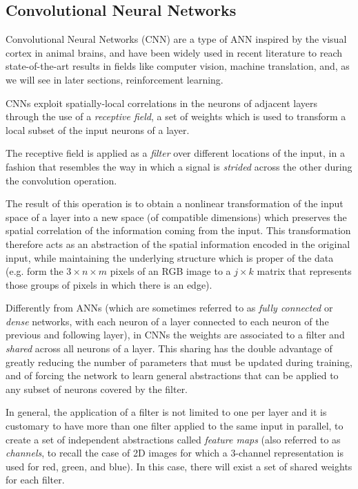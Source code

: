 \subsection{Convolutional Neural Networks} \label{s:CNN}
Convolutional Neural Networks (CNN) are a type of ANN inspired by the visual 
cortex in animal brains, and have been widely used in recent literature to 
reach state-of-the-art results in fields like computer vision, machine 
translation, and, as we will see in later sections, reinforcement learning.

CNNs exploit spatially-local correlations in the neurons of adjacent 
layers through the use of a \textit{receptive field}, a set of weights which is 
used to transform a local subset of the input neurons of a layer.

The receptive field is applied as a \textit{filter} over different locations of 
the input, in a fashion that resembles the way in which a signal is 
\textit{strided} across the other during the convolution operation.

The result of this operation is to obtain a nonlinear transformation of 
the input space of a layer into a new space (of compatible dimensions) which
preserves the spatial correlation of the information coming from the input.
This transformation therefore acts as an abstraction of the spatial information 
encoded in the original input, while maintaining the underlying structure which
is proper of the data (e.g. form the $3 \times n \times m$ pixels of an RGB image to
a $j \times k$ matrix that represents those groups of pixels in which there is
an edge).

Differently from ANNs (which are sometimes referred to as \textit{fully connected}
or \textit{dense} networks, with each neuron of a layer connected to each neuron 
of the previous and following layer), in CNNs the weights are associated to a 
filter and \textit{shared} across all neurons of a layer. This sharing has the 
double advantage of greatly reducing the number of parameters that must be
updated during training, and of forcing the network to learn general abstractions
that can be applied to any subset of neurons covered by the filter.

In general, the application of a filter is not limited to one per layer and it 
is customary to have more than one filter applied to the same input in parallel,
to create a set of independent abstractions called \textit{feature maps} (also
referred to as \textit{channels}, to recall the case of 2D images for which 
a 3-channel representation is used for red, green, and blue). In 
this case, there will exist a set of shared weights for each filter.

